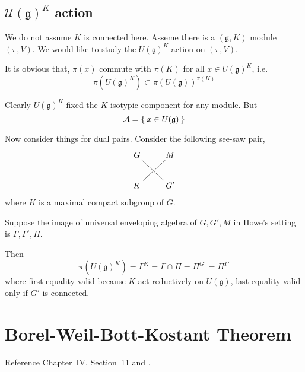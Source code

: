 \documentclass[12pt]{article}
\makeatletter
\def\fgg{\mathfrak{g}}
\def\caa{\mathcal{A}}
\def\cuu{\mathcal{U}}
\def\seesawpair#1#2#3#4{
\xymatrix{
{#1} \ar@{-}[dr]& {#2} \\
{#3} \ar@{-}[ur] & {#4}}
}
\makeatother
\begin{document}
\subsection{$\cuu(\fgg)^K$ action}
We do not assume $K$ is connected here.  
Asseme there is a $(\fgg,K)$ module $(\pi,V)$.
We would like to study the $U(\fgg)^K$ action on $(\pi,V)$. 

It is obvious that, 
$\pi(x)$ commute with $\pi(K)$ for all $x \in U(\fgg)^K$, i.e. 
\[
\pi(U(\fgg)^K) \subset \pi(U(\fgg))^{\pi(K)}
\]


Clearly $U(\fgg)^K$ fixed the $K$-isotypic component for any module.
But 
\[
\caa =\Set{x\in U(\fgg)}
\]

Now consider things for dual pairs.
Consider the following see-saw pair, 
\[
\seesawpair{G}{M}{K}{G'}
\]
where $K$ is a maximal compact subgroup of $G$. 

Suppose the image of universal enveloping algebra of $G,G',M$
in Howe's setting \cite{Howe1989Rem} is $\Gamma,\Gamma', \Pi$.

Then
\[
\pi(U(\fgg)^K) = \Gamma^K = \Gamma \cap \Pi = \Pi^{G'} =\Pi^{\Gamma'}
\]
where first equality valid because $K$ act reductively on $U(\fgg)$,
last equality valid only if $G'$ is connected.



\section{Borel-Weil-Bott-Kostant Theorem}
Reference \cite{KnappVogan1995} Chapter~IV, Section~11 and
\cite{EnrightWallach1980}.
\end{document}
